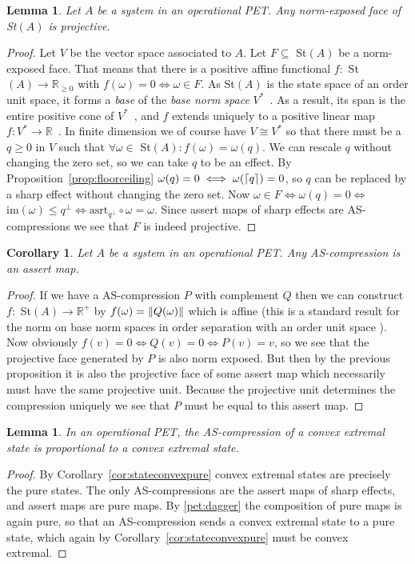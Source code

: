 \documentclass[b5paper,onecolumn,12pt,accepted=2019-05-03, issue=1, volume=1, shorttitle=papers/compositionality-1-1]{compositionalityarticle}
\DeclarePairedDelimiter{\ceil}{\lceil}{\rceil}
\newcounter{counter}
\numberwithin{counter}{section}
\newtheorem{lemma}[counter]{Lemma}
\newtheorem{corollary}[counter]{Corollary}
\newcommand{\R}{\mathbb{R}}
\newcommand{\asrt}{\text{asrt}}
\newcommand{\im}[1]{\text{im}(#1)}
\begin{document}
\begin{lemma}\label{lem:normexposed}
	Let $A$ be a system in an operational PET. Any norm-exposed face of St$(A)$ is projective.
\end{lemma}
\begin{proof}
	Let $V$ be the vector space associated to $A$. Let $F\subseteq $ St$(A)$ be a norm-exposed face. That means that there is a positive affine functional $f:$ St$(A)\rightarrow \R_{\geq 0}$ with $f(\omega)=0\iff \omega\in F$. As St$(A)$ is the state space of an order unit space, it forms a \emph{base} of the \emph{base norm space} $V^*$~\cite[Theorem 1.19]{alfsen2012state}. As a result, its span is the entire positive cone of $V^*$~\cite[Definition 1.10]{alfsen2012state}, and $f$ extends uniquely to a positive linear map $f:V^*\rightarrow \R$~\cite[Proposition 1.11]{alfsen2012state}. In finite dimension we of course have $V\cong V^*$ so that there must be a $q\geq 0$ in $V$ such that $\forall \omega\in$ St$(A): f(\omega) = \omega(q)$. We can rescale $q$ without changing the zero set, so we can take $q$ to be an effect. By Proposition~\ref{prop:floorceiling} $\omega(q)=0\iff \omega(\ceil{q})=0$, so $q$ can be replaced by a sharp effect without changing the zero set. Now $\omega \in F \iff \omega(q)=0 \iff $ $\im{\omega}\leq q^\perp \iff \asrt_{q^\perp}\circ \omega = \omega$. Since assert maps of sharp effects are AS-compressions we see that $F$ is indeed projective.
\end{proof}

\begin{corollary} \label{cor:comp-assert}
	Let $A$ be a system in an operational PET. Any AS-compression is an assert map.
\end{corollary}
\begin{proof}
	If we have a AS-compression $P$ with complement $Q$ then we can construct $f:$ St$(A)\rightarrow \R^+$ by $f(\omega) = \norm{Q(\omega)}$ which is affine (this is a standard result for the norm on base norm spaces in order separation with an order unit space \cite{alfsen2012geometry}). Now obviously $f(v)=0 \iff Q(v)=0 \iff P(v)=v$, so we see that the projective face generated by $P$ is also norm exposed. But then by the previous proposition it is also the projective face of some assert map which necessarily must have the same projective unit. Because the projective unit determines the compression uniquely we see that $P$ must be equal to this assert map.
\end{proof}


\begin{lemma}\label{lem:compressionpure}
	In an operational PET, the AS-compression of a convex extremal state is proportional to a convex extremal state.
\end{lemma}
\begin{proof}
    By Corollary~\ref{cor:stateconvexpure} convex extremal states are precisely the pure states.
	The only AS-compressions are the assert maps of sharp effects, and assert maps are pure maps. By \ref{pet:dagger} the composition of pure maps is again pure, so that an AS-compression sends a convex extremal state to a pure state, which again by Corollary~\ref{cor:stateconvexpure} must be convex extremal.
\end{proof}
\end{document}
